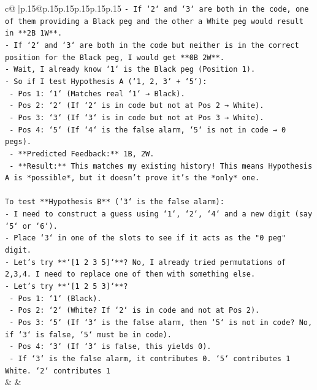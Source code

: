 \documentclass{article}
\begin{document}
{\begin{supertabular}{c@{$\;$}|p{.15\linewidth}@{}p{.15\linewidth}p{.15\linewidth}p{.15\linewidth}p{.15\linewidth}p{.15\linewidth}}
{{{\texttt{{-} If `2` and `3` are both in the code, one of them providing a Black peg and the other a White peg would result in **2B 1W**.} \\
\texttt{{-} If `2` and `3` are both in the code but neither is in the correct position for the Black peg, I would get **0B 2W**.} \\
\texttt{{-} Wait, I already know `1` is the Black peg (Position 1).} \\
\texttt{{-} So if I test Hypothesis A (`1, 2, 3` + `5`):} \\
\texttt{    {-} Pos 1: `1` (Matches real `1` → Black).} \\
\texttt{    {-} Pos 2: `2` (If `2` is in code but not at Pos 2 → White).} \\
\texttt{    {-} Pos 3: `3` (If `3` is in code but not at Pos 3 → White).} \\
\texttt{    {-} Pos 4: `5` (If `4` is the false alarm, `5` is not in code → 0 pegs).} \\
\texttt{    {-} **Predicted Feedback:** 1B, 2W.} \\
\texttt{    {-} **Result:** This matches my existing history! This means Hypothesis A is *possible*, but it doesn't prove it's the *only* one.} \\
\\ 
\texttt{To test **Hypothesis B** (`3` is the false alarm):} \\
\texttt{{-} I need to construct a guess using `1`, `2`, `4` and a new digit (say `5` or `6`).} \\
\texttt{{-} Place `3` in one of the slots to see if it acts as the "0 peg" digit.} \\
\texttt{{-} Let's try **`{[}1 2 3 5{]}`**? No, I already tried permutations of 2,3,4. I need to replace one of them with something else.} \\
\texttt{{-} Let's try **`{[}1 2 5 3{]}`**?} \\
\texttt{    {-} Pos 1: `1` (Black).} \\
\texttt{    {-} Pos 2: `2` (White? If `2` is in code and not at Pos 2).} \\
\texttt{    {-} Pos 3: `5` (If `3` is the false alarm, then `5` is not in code? No, if `3` is false, `5` must be in code).} \\
\texttt{    {-} Pos 4: `3` (If `3` is false, this yields 0).} \\
\texttt{    {-} If `3` is the false alarm, it contributes 0. `5` contributes 1 White. `2` contributes 1} \\
            }
        }
    }
    & & \\ \\


\end{supertabular}}
\end{document}
